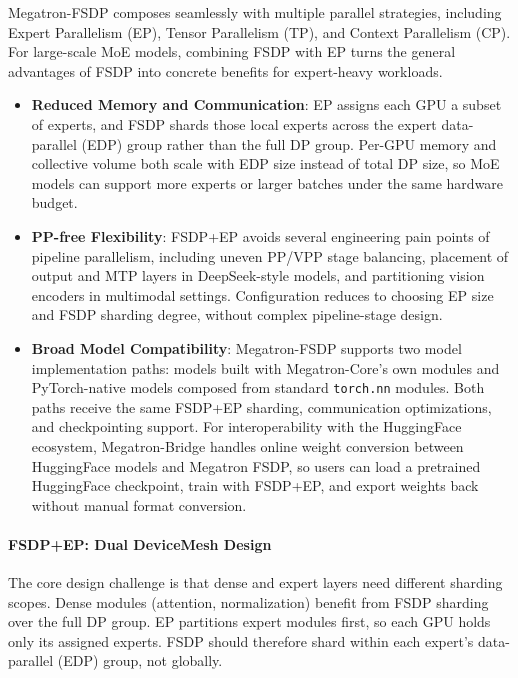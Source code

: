 \documentclass[10pt,logo,copyright]{nvidiatechreport}
\begin{document}
Megatron-FSDP composes seamlessly with multiple parallel strategies, including Expert Parallelism (EP), Tensor Parallelism (TP), and Context Parallelism (CP). For large-scale MoE models, combining FSDP with EP turns the general advantages of FSDP into concrete benefits for expert-heavy workloads.

\begin{itemize}[itemsep=2pt]
  \item \textbf{Reduced Memory and Communication}: EP assigns each GPU a subset of experts, and FSDP shards those local experts across the expert data-parallel (EDP) group rather than the full DP group. Per-GPU memory and collective volume both scale with EDP size instead of total DP size, so MoE models can support more experts or larger batches under the same hardware budget.

  \item \textbf{PP-free Flexibility}: FSDP+EP avoids several engineering pain points of pipeline parallelism, including uneven PP/VPP stage balancing, placement of output and MTP layers in DeepSeek-style models, and partitioning vision encoders in multimodal settings. Configuration reduces to choosing EP size and FSDP sharding degree, without complex pipeline-stage design.

  \item \textbf{Broad Model Compatibility}: Megatron-FSDP supports two model implementation paths: models built with Megatron-Core's own modules and PyTorch-native models composed from standard \texttt{torch.nn} modules. Both paths receive the same FSDP+EP sharding, communication optimizations, and checkpointing support. For interoperability with the HuggingFace ecosystem, Megatron-Bridge handles online weight conversion between HuggingFace models and Megatron FSDP, so users can load a pretrained HuggingFace checkpoint, train with FSDP+EP, and export weights back without manual format conversion.
\end{itemize}

\paragraph{FSDP+EP: Dual DeviceMesh Design}

The core design challenge is that dense and expert layers need different sharding scopes. Dense modules (attention, normalization) benefit from FSDP sharding over the full DP group. EP partitions expert modules first, so each GPU holds only its assigned experts. FSDP should therefore shard within each expert's data-parallel (EDP) group, not globally.
\end{document}
